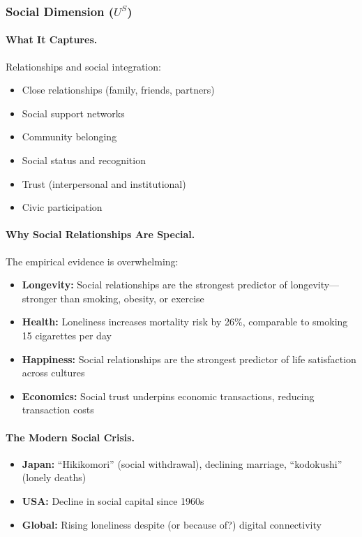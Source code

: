 \subsubsection{Social Dimension ($U^S$)}

\paragraph{What It Captures.}
Relationships and social integration:
\begin{itemize}
\item Close relationships (family, friends, partners)
\item Social support networks
\item Community belonging
\item Social status and recognition
\item Trust (interpersonal and institutional)
\item Civic participation
\end{itemize}

\paragraph{Why Social Relationships Are Special.}
The empirical evidence is overwhelming:

\begin{itemize}
\item \textbf{Longevity:} Social relationships are the strongest predictor 
of longevity---stronger than smoking, obesity, or exercise \citep{holt2010social}

\item \textbf{Health:} Loneliness increases mortality risk by 26\%, 
comparable to smoking 15 cigarettes per day \citep{holt2015loneliness}

\item \textbf{Happiness:} Social relationships are the strongest predictor 
of life satisfaction across cultures \citep{helliwell2004social}

\item \textbf{Economics:} Social trust underpins economic transactions, 
reducing transaction costs \citep{knack1997does}
\end{itemize}

\paragraph{The Modern Social Crisis.}
\begin{itemize}
\item \textbf{Japan:} ``Hikikomori'' (social withdrawal), declining marriage, 
``kodokushi'' (lonely deaths)
\item \textbf{USA:} Decline in social capital since 1960s \citep{putnam2000bowling}
\item \textbf{Global:} Rising loneliness despite (or because of?) digital connectivity
\end{itemize}

